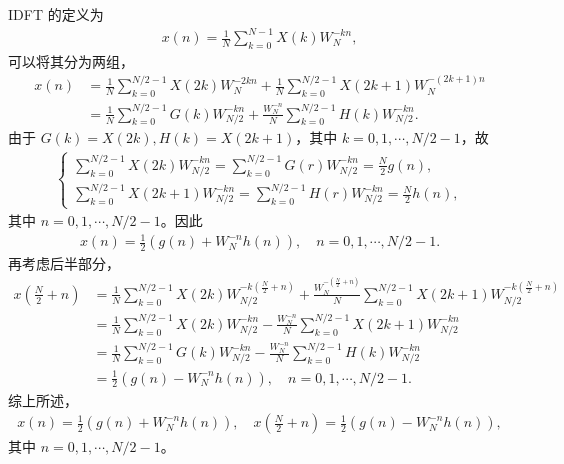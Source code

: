 \begin{solution}
    IDFT 的定义为
    \begin{align*}
        x(n) = \frac{1}{N}\sum_{k = 0}^{N - 1}X(k)W_N^{-kn},
    \end{align*}
    可以将其分为两组，
    \begin{align*}
        x(n) & = \frac{1}{N}\sum_{k = 0}^{N/2 - 1}X(2k)W_N^{-2kn}
            + \frac{1}{N}\sum_{k = 0}^{N/2 - 1}X(2k + 1)W_N^{-(2k + 1)n} \\
        & = \frac{1}{N}\sum_{k = 0}^{N/2 - 1}G(k)W_{N/2}^{-kn}
            + \frac{W_N^{-n}}{N}\sum_{k = 0}^{N/2 - 1}H(k)W_{N/2}^{-kn}.
    \end{align*}
    由于 $G(k) = X(2k), H(k) = X(2k + 1)$，其中 $k = 0, 1, \cdots, N / 2 - 1$，故
    \begin{align*}
        \begin{cases}
            \sum_{k = 0}^{N/2 - 1}X(2k)W_{N/2}^{-kn}
                = \sum_{k = 0}^{N/2 - 1}G(r)W_{N/2}^{-kn} = \frac{N}{2}g(n), \\
            \sum_{k = 0}^{N/2 - 1}X(2k + 1)W_{N/2}^{-kn}
                = \sum_{k = 0}^{N/2 - 1}H(r)W_{N/2}^{-kn} = \frac{N}{2}h(n),
        \end{cases}
    \end{align*}
    其中 $n = 0, 1, \cdots, N/2 - 1$。因此
    \begin{align*}
        x(n) = \frac{1}{2}\left(g(n) + W_N^{-n}h(n)\right), \quad n = 0, 1, \cdots, N / 2 - 1.
    \end{align*}
    再考虑后半部分，
    \begin{align*}
        x\left(\frac{N}{2} + n\right) & = \frac{1}{N}\sum_{k = 0}^{N/2 - 1}X(2k)W_{N/2}^{-k\left(\frac{N}{2} + n\right)}
            + \frac{W_N^{-\left(\frac{N}{2} + n\right)}}{N}\sum_{k = 0}^{N/2 - 1}X(2k + 1)W_{N/2}^{-k\left(\frac{N}{2} + n\right)} \\
        & = \frac{1}{N}\sum_{k = 0}^{N/2 - 1}X(2k)W_{N/2}^{-kn}
            - \frac{W_N^{-n}}{N}\sum_{k = 0}^{N/2 - 1}X(2k + 1)W_{N/2}^{-kn} \\
        & = \frac{1}{N}\sum_{k = 0}^{N/2 - 1}G(k)W_{N/2}^{-kn}
            - \frac{W_N^{-n}}{N}\sum_{k = 0}^{N/2 - 1}H(k)W_{N/2}^{-kn} \\
        & = \frac{1}{2}\left(g(n) - W_N^{-n}h(n)\right), \quad n = 0, 1, \cdots, N / 2 - 1.
    \end{align*}
    综上所述，
    \begin{align*}
        x(n) = \frac{1}{2}\left(g(n) + W_N^{-n}h(n)\right),
            \quad x\left(\frac{N}{2} + n\right) = \frac{1}{2}\left(g(n) - W_N^{-n}h(n)\right),
    \end{align*}
    其中 $n = 0, 1, \cdots, N / 2 - 1$。
\end{solution}
